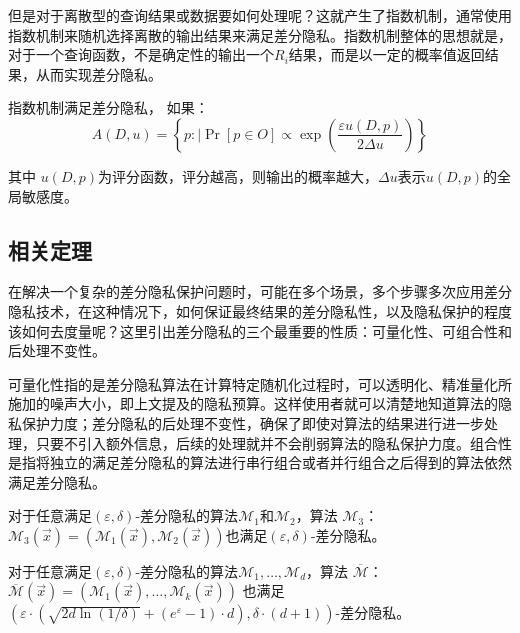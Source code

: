 但是对于离散型的查询结果或数据要如何处理呢？这就产生了指数机制，通常使用指数机制来随机选择离散的输出结果来满足差分隐私。指数机制整体的思想就是，对于一个查询函数，不是确定性的输出一个$R_{i}$结果，而是以一定的概率值返回结果，从而实现差分隐私。

\begin{theorem}[指数机制]\label{指数机制}
指数机制满足差分隐私， 如果：
$$
A(D,u)=\left\{p: \mid \operatorname{Pr}[p \in O] \propto \exp \left(\frac{\varepsilon u(D,p)}{2 \Delta u}\right)\right\}
$$
\end{theorem}
其中 $u(D,p)$为评分函数，评分越高，则输出的概率越大，$\Delta u$表示$u(D,p)$的全局敏感度。

\subsection{相关定理}

在解决一个复杂的差分隐私保护问题时，可能在多个场景，多个步骤多次应用差分隐私技术，在这种情况下，如何保证最终结果的差分隐私性，以及隐私保护的程度该如何去度量呢？这里引出差分隐私的三个最重要的性质：可量化性、可组合性和后处理不变性。

可量化性指的是差分隐私算法在计算特定随机化过程时，可以透明化、精准量化所施加的噪声大小，即上文提及的隐私预算。这样使用者就可以清楚地知道算法的隐私保护力度；差分隐私的后处理不变性，确保了即使对算法的结果进行进一步处理，只要不引入额外信息，后续的处理就并不会削弱算法的隐私保护力度。组合性是指将独立的满足差分隐私的算法进行串行组合或者并行组合之后得到的算法依然满足差分隐私。

\begin{theorem}\label{串行组合}
对于任意满足$(\varepsilon, \delta)$-差分隐私的算法$\mathcal{M}_{1}$和$\mathcal{M}_{2}$，算法 $\mathcal{M}_{3}$：$\mathcal{M}_{3}(\vec{x})=\left(\mathcal{M}_{1}(\vec{x}), \mathcal{M}_{2}(\vec{x})\right)$也满足$(\varepsilon, \delta)$-差分隐私。
\end{theorem}

\begin{theorem}\label{并行组合}
对于任意满足$(\varepsilon, \delta)$-差分隐私的算法$\mathcal{M}_{1}, \ldots, \mathcal{M}_{d}$，算法 $\overline{\mathcal{M}}$：$\overline{\mathcal{M}}(\vec{x})=\left(\mathcal{M}_{1}(\vec{x}), \ldots, \mathcal{M}_{k}(\vec{x})\right)$ 也满足$\left(\varepsilon \cdot\left(\sqrt{2 d \ln (1 / \delta)}+\left(e^{\varepsilon}-1\right) \cdot d\right), \delta \cdot(d+1)\right)$-差分隐私。
\end{theorem}


